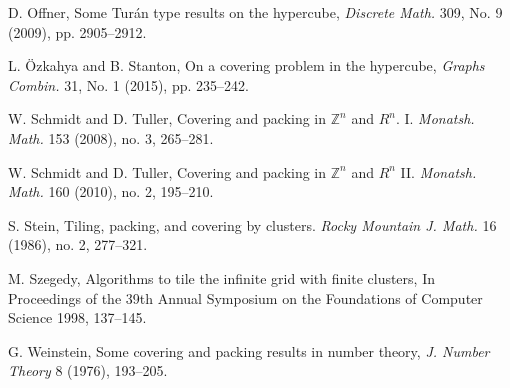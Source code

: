 \documentclass[12pt]{article}
\newcommand{\Z}{\ensuremath{\mathbb Z}}
\begin{document}
\begin{thebibliography}{99}
 D. Offner, Some Tur\'{a}n type results on the hypercube,
\textit{Discrete Math.} 309, No. 9 (2009), pp. 2905--2912.

 L. \"Ozkahya and B. Stanton, On a covering problem in the hypercube, \textit{Graphs Combin.} 31, No. 1 (2015), pp. 235--242.

 W. Schmidt and D. Tuller, Covering and packing in  $\Z^n$ and $R^n$. I. \textit{Monatsh. Math.} 153 (2008), no. 3, 265--281.

 W. Schmidt and D. Tuller, Covering and packing in $\Z^n$ and $R^n$ II. \textit{Monatsh. Math.} 160 (2010), no. 2, 195--210.

 S. Stein, Tiling, packing, and covering by clusters. 
\textit{Rocky Mountain J. Math.} 16 (1986), no. 2, 277--321. 

 M. Szegedy, Algorithms to tile the infinite grid with finite clusters, In Proceedings of the 39th Annual Symposium on the Foundations of Computer Science 1998, 137--145.


 G. Weinstein, Some covering and packing results in number theory, \textit{J. Number Theory} 8 (1976), 193--205.

\end{thebibliography}
\end{document}

